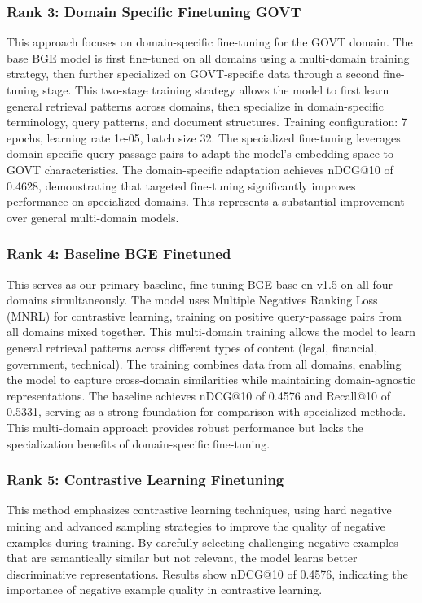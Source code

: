 \documentclass[conference]{IEEEtran}
\begin{document}
\subsubsection{Rank 3: Domain Specific Finetuning GOVT}

This approach focuses on domain-specific fine-tuning for the GOVT domain. The base BGE model is first fine-tuned on all domains using a multi-domain training strategy, then further specialized on GOVT-specific data through a second fine-tuning stage. This two-stage training strategy allows the model to first learn general retrieval patterns across domains, then specialize in domain-specific terminology, query patterns, and document structures. Training configuration: 7 epochs, learning rate 1e-05, batch size 32. The specialized fine-tuning leverages domain-specific query-passage pairs to adapt the model's embedding space to GOVT characteristics. The domain-specific adaptation achieves nDCG@10 of 0.4628, demonstrating that targeted fine-tuning significantly improves performance on specialized domains. This represents a substantial improvement over general multi-domain models. 

\subsubsection{Rank 4: Baseline BGE Finetuned}

This serves as our primary baseline, fine-tuning BGE-base-en-v1.5 on all four domains simultaneously. The model uses Multiple Negatives Ranking Loss (MNRL) for contrastive learning, training on positive query-passage pairs from all domains mixed together. This multi-domain training allows the model to learn general retrieval patterns across different types of content (legal, financial, government, technical). The training combines data from all domains, enabling the model to capture cross-domain similarities while maintaining domain-agnostic representations. The baseline achieves nDCG@10 of 0.4576 and Recall@10 of 0.5331, serving as a strong foundation for comparison with specialized methods. This multi-domain approach provides robust performance but lacks the specialization benefits of domain-specific fine-tuning. 

\subsubsection{Rank 5: Contrastive Learning Finetuning}

This method emphasizes contrastive learning techniques, using hard negative mining and advanced sampling strategies to improve the quality of negative examples during training. By carefully selecting challenging negative examples that are semantically similar but not relevant, the model learns better discriminative representations. Results show nDCG@10 of 0.4576, indicating the importance of negative example quality in contrastive learning. 
\end{document}
